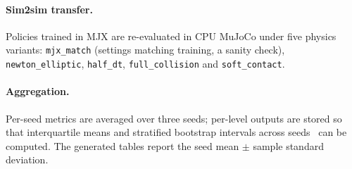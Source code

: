 \paragraph{Sim2sim transfer.} Policies trained in MJX are re-evaluated in
CPU MuJoCo under five physics variants: \texttt{mjx\_match} (settings
matching training, a sanity check), \texttt{newton\_elliptic},
\texttt{half\_dt}, \texttt{full\_collision} and \texttt{soft\_contact}.

\paragraph{Aggregation.} Per-seed metrics are averaged over three seeds;
per-level outputs are stored so that interquartile means and
stratified bootstrap intervals across seeds~\citep{agarwal2021precipice}
can be computed.
The generated tables report the seed mean $\pm$ sample standard deviation.
